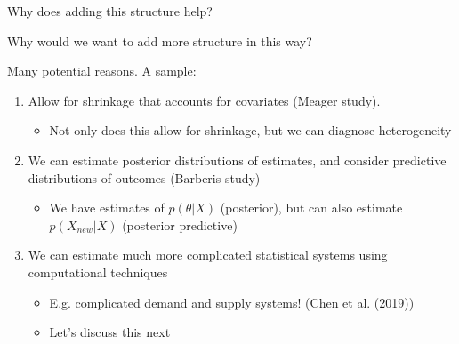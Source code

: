 \documentclass[notes,11pt, aspectratio=169]{beamer}
\newenvironment{wideitemize}{\itemize\addtolength{\itemsep}{10pt}}{\enditemize}
\begin{document}
\begin{frame}{Why does adding this structure help?}
  \begin{wideitemize}
  \item Why would we want to add more structure in this way?
  \item Many potential reasons. A sample:
    \begin{enumerate}
    \item Allow for shrinkage that accounts for covariates (Meager study).
      \begin{itemize}
      \item Not only does this allow for shrinkage, but we can
        diagnose heterogeneity
      \end{itemize}
    \item We can estimate posterior distributions of estimates, and
      consider predictive distributions of outcomes (Barberis study)
      \begin{itemize}
      \item We have estimates of $p(\theta | X)$ (posterior), but can
        also estimate $p(X_{new} | X)$ (posterior predictive)
      \end{itemize}
    \item We can estimate much more complicated statistical systems using computational techniques
      \begin{itemize}
      \item E.g. complicated demand and supply systems! (Chen et al. (2019))
      \item Let's discuss this next
      \end{itemize}
    \end{enumerate}
  \end{wideitemize}
\end{frame}
\end{document}
